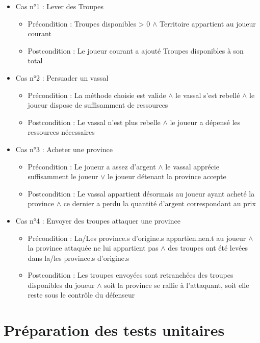 \documentclass[12pt,a4paper]{article}
\begin{document}
\begin{itemize}
\item Cas n°1 : Lever des Troupes
	\begin{itemize}
	\item Précondition : Troupes disponibles > 0 $ \land $ Territoire appartient au joueur courant
	\item Postcondition : Le joueur courant a ajouté Troupes disponibles à son total
	\end{itemize}
\item Cas n°2 : Persuader un vassal
	\begin{itemize}
	\item Précondition : La méthode choisie est valide $ \land $ le vassal s'est rebellé $ \land $ le joueur dispose de suffisamment de ressources
	\item Postcondition : Le vassal n'est plus rebelle $ \land $ le joueur a dépensé les ressources nécessaires
	\end{itemize}
\item Cas n°3 : Acheter une province
	\begin{itemize}
	\item Précondition : Le joueur a assez d'argent $ \land $ le vassal apprécie suffisamment le joueur $ \lor $ le joueur détenant la province accepte
	\item Postcondition : Le vassal appartient désormais au joueur ayant acheté la province $ \land $ ce dernier a perdu la quantité d'argent correspondant au prix
	\end{itemize}
\item Cas n°4 : Envoyer des troupes attaquer une province
	\begin{itemize}
	\item Précondition : La/Les province.s d'origine.s appartien.nen.t au joueur $ \land $ la province attaquée ne lui appartient pas $ \land $ des troupes ont été levées dans la/les province.s d'origine.s
	\item Postcondition : Les troupes envoyées sont retranchées des troupes disponibles du joueur $ \land $ soit la province se rallie à l'attaquant, soit elle reste sous le contrôle du défenseur
	\end{itemize}
\end{itemize}

\newpage

\section{Préparation des tests unitaires}
\end{document}
